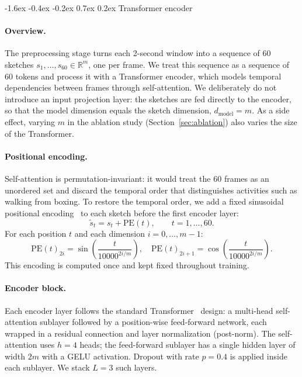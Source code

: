 \documentclass[10pt,twocolumn]{article}
\makeatletter
\renewcommand{\subsection}{%
  \@startsection{subsection}{2}{\z@}%
  {-1.6ex \@plus -0.4ex \@minus -0.2ex}%
  {0.7ex \@plus 0.2ex}%
  {\normalfont\normalsize\bfseries}}
\makeatother
\begin{document}
\subsection{Transformer encoder}
\label{sec:transformer}

\paragraph{Overview.}
The preprocessing stage turns each 2-second window into a sequence of
$60$ sketches $s_1, \ldots, s_{60} \in \mathbb{R}^{m}$, one per frame.
We treat this sequence as a sequence of $60$ tokens and process it with
a Transformer encoder, which models temporal dependencies between frames
through self-attention. We deliberately do not introduce an input projection
layer: the sketches are fed directly to the encoder, so that the model
dimension equals the sketch dimension, $d_{\text{model}} = m$. As a side
effect, varying $m$ in the ablation study (Section~\ref{sec:ablation}) also
varies the size of the Transformer.

\paragraph{Positional encoding.}
Self-attention is permutation-invariant: it would treat the $60$ frames as an
unordered set and discard the temporal order that distinguishes activities such
as walking from boxing. To restore the temporal order, we add a fixed
sinusoidal positional encoding~\cite{vaswani2017attention} to each sketch before
the first encoder layer:
\[
\tilde{s}_t = s_t + \mathrm{PE}(t), \qquad t = 1, \ldots, 60.
\]
For each position $t$ and each dimension $i = 0, \ldots, m-1$:
\[
\mathrm{PE}(t)_{2i} = \sin\!\left(\frac{t}{10000^{2i / m}}\right),
\quad
\mathrm{PE}(t)_{2i+1} = \cos\!\left(\frac{t}{10000^{2i / m}}\right).
\]
This encoding is computed once and kept fixed throughout training.

\paragraph{Encoder block.}
Each encoder layer follows the standard
Transformer~\cite{vaswani2017attention} design: a multi-head self-attention
sublayer followed by a position-wise feed-forward network, each wrapped in a
residual connection and layer normalization (post-norm). The self-attention uses $h = 4$
heads; the feed-forward sublayer has a single hidden layer of width $2m$ with
a GELU activation. Dropout with rate $p = 0.4$ is applied inside each sublayer.
We stack $L = 3$ such layers.
\end{document}
